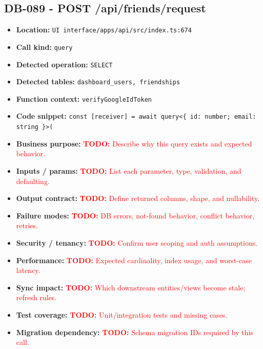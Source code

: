 \documentclass[11pt]{article}
\newcommand{\todoitem}[1]{\textcolor{red}{\textbf{TODO:} #1}}
\begin{document}
\subsection{DB-089 - POST /api/friends/request}
\begin{itemize}[leftmargin=1.5em]
\item \textbf{Location:} \texttt{UI interface/apps/api/src/index.ts:674}
\item \textbf{Call kind:} \texttt{query}
\item \textbf{Detected operation:} \texttt{SELECT}
\item \textbf{Detected tables:} \texttt{dashboard\_users, friendships}
\item \textbf{Function context:} \texttt{verifyGoogleIdToken}
\item \textbf{Code snippet:} \texttt{const [receiver] = await query<\{ id: number; email: string \}>(}
\item \textbf{Business purpose:} \todoitem{Describe why this query exists and expected behavior.}
\item \textbf{Inputs / params:} \todoitem{List each parameter, type, validation, and defaulting.}
\item \textbf{Output contract:} \todoitem{Define returned columns, shape, and nullability.}
\item \textbf{Failure modes:} \todoitem{DB errors, not-found behavior, conflict behavior, retries.}
\item \textbf{Security / tenancy:} \todoitem{Confirm user scoping and auth assumptions.}
\item \textbf{Performance:} \todoitem{Expected cardinality, index usage, and worst-case latency.}
\item \textbf{Sync impact:} \todoitem{Which downstream entities/views become stale; refresh rules.}
\item \textbf{Test coverage:} \todoitem{Unit/integration tests and missing cases.}
\item \textbf{Migration dependency:} \todoitem{Schema migration IDs required by this call.}
\end{itemize}
\end{document}
